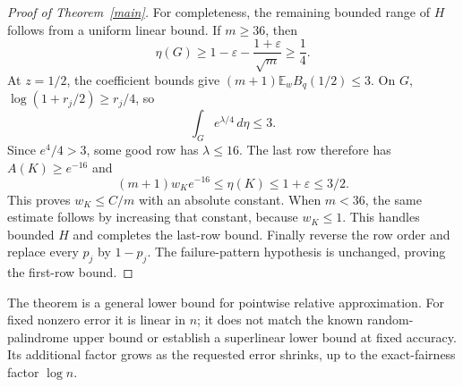 \documentclass[11pt]{article}
\newcommand{\E}{\mathbb E}
\begin{document}
\begin{proof}[Proof of Theorem~\ref{main}]
For completeness, the remaining bounded range of $H$ follows from a
uniform linear bound. If $m\ge36$, then
\[
 \eta(G)\ge1-\varepsilon-\frac{1+\varepsilon}{\sqrt m}\ge\frac14.
\]
At $z=1/2$, the coefficient bounds give
$(m+1)\E_w B_q(1/2)\le3$.
On $G$, $\log(1+r_j/2)\ge r_j/4$, so
\[
 \int_G e^{\lambda/4}\,d\eta\le3.
\]
Since $e^4/4>3$, some good row has $\lambda\le16$.
The last row therefore has $A(K)\ge e^{-16}$ and
\[
 (m+1)w_K e^{-16}\le\eta(K)\le1+\varepsilon\le3/2.
\]
This proves $w_K\le C/m$ with an absolute constant. When $m<36$,
the same estimate follows by increasing that constant, because
$w_K\le1$. This handles bounded $H$ and completes the last-row bound.
Finally reverse the row order and replace every $p_j$ by $1-p_j$.
The failure-pattern hypothesis is unchanged, proving the first-row bound.
\end{proof}

The theorem is a general lower bound for pointwise relative approximation.
For fixed nonzero error it is linear in $n$; it does not match the known
random-palindrome upper bound or establish a superlinear lower bound
at fixed accuracy. Its additional factor grows as the requested error
shrinks, up to the exact-fairness factor $\log n$.
\end{document}
